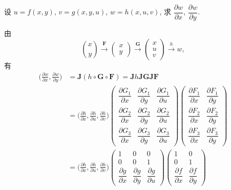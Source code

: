 \begin{example}\label{ex:8.2.11}
设 $u = f(x, y)$, $v = g(x, y, u)$, $w = h(x, u, v)$, 求 $\dfrac{\partial w}{\partial x}$, $\dfrac{\partial w}{\partial y}$.

\begin{solution}[解法 1]
由
\[
  \binom{x}{y} \xrightarrow{\mathbf{F}} \begin{pmatrix} x \\ y \end{pmatrix} \xrightarrow{\mathbf{G}} \begin{pmatrix} x \\ u \\ v \end{pmatrix} \xrightarrow{h} w,
\]
有
\begin{align*}
  \Big(\frac{\partial w}{\partial x}, \frac{\partial w}{\partial y}\Big)
  &= \boldsymbol{J}(h \circ \mathbf{G} \circ \mathbf{F}) = \boldsymbol{J}h\boldsymbol{J}\mathbf{G}\boldsymbol{J}\mathbf{F} \\
  &= \Big(\frac{\partial h}{\partial x}, \frac{\partial h}{\partial u}, \frac{\partial h}{\partial v}\Big)\begin{pmatrix}
    \dfrac{\partial G_{1}}{\partial x} & \dfrac{\partial G_{1}}{\partial y} & \dfrac{\partial G_{1}}{\partial u} \\[2mm]
    \dfrac{\partial G_{2}}{\partial x} & \dfrac{\partial G_{2}}{\partial y} & \dfrac{\partial G_{2}}{\partial u} \\[2mm]
    \dfrac{\partial G_{3}}{\partial x} & \dfrac{\partial G_{3}}{\partial y} & \dfrac{\partial G_{3}}{\partial u}
  \end{pmatrix}\begin{pmatrix}
    \dfrac{\partial F_{1}}{\partial x} & \dfrac{\partial F_{1}}{\partial y} \\[2mm]
    \dfrac{\partial F_{2}}{\partial x} & \dfrac{\partial F_{2}}{\partial y} \\[2mm]
    \dfrac{\partial F_{3}}{\partial x} & \dfrac{\partial F_{3}}{\partial y}
  \end{pmatrix} \\
  &= \Big(\frac{\partial h}{\partial x}, \frac{\partial h}{\partial u}, \frac{\partial h}{\partial v}\Big)\begin{pmatrix} 1 & 0 & 0 \\ 0 & 0 & 1 \\ \dfrac{\partial g}{\partial x} & \dfrac{\partial g}{\partial y} & \dfrac{\partial g}{\partial u} \end{pmatrix}\begin{pmatrix} 1 & 0 \\ 0 & 1 \\ \dfrac{\partial f}{\partial x} & \dfrac{\partial f}{\partial y} \end{pmatrix} \\

\end{align*}
\end{solution}
\end{example}
